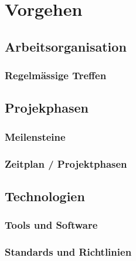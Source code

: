 
\chapter{Vorgehen}
\label{chap:procedure}

\section{Arbeitsorganisation}
\label{sec:organization}

\subsection{Regelmässige Treffen}
\label{subsec:meetings}

\section{Projekphasen}
\label{sec:project_schedule}

\subsection{Meilensteine}
\label{subsec:milestones}

\subsection{Zeitplan / Projektphasen}
\label{subsec:timeschedule}

\section{Technologien}
\label{sec:technologies}

\subsection{Tools und Software}
\label{subsec:tools_software}

\subsection{Standards und Richtlinien}
\label{subsec:standards_guidelines}
